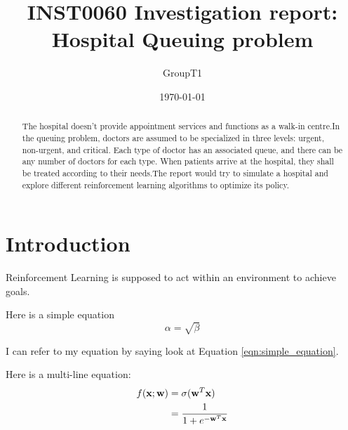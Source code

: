 \documentclass[11point]{article}
\renewcommand{\vec}[1]{\boldsymbol{\mathbf{#1}}}
\newcommand{\datapoint}{\vec{x}}
\newcommand{\weights}{\vec{w}}
\begin{document}
\title{INST0060 Investigation report:\\Hospital Queuing problem}
\author[*]{GroupT1}
\date{\today}

\maketitle

\begin{abstract}
The hospital doesn't provide appointment services and functions as a walk-in centre.In the queuing problem, doctors are assumed to be specialized in three levels: urgent, non-urgent, and critical. Each type of doctor has an associated queue, and there can be any number of doctors for each type. When patients arrive at the hospital, they shall be treated according to their needs.The report would try to simulate a hospital and explore different reinforcement learning algorithms to optimize its policy.
\end{abstract}

\section{Introduction}
\label{sec:intro}

Reinforcement Learning is supposed to act within an environment to achieve goals.

Here is a simple equation
\begin{equation}
    \label{eqn:simple_equation}
    \alpha = \sqrt{ \beta }
\end{equation}

I can refer to my equation by saying look at Equation \eqref{eqn:simple_equation}.

Here is a multi-line equation:
\begin{align}
f(\datapoint; \weights)
& = \sigma(\weights^T\datapoint)
\label{eqn:logistic_regresion_decision_function} %
\\ %
& = \frac{1}{1+e^{-\weights^T\datapoint}}
\notag %
\end{align}
\end{document}
